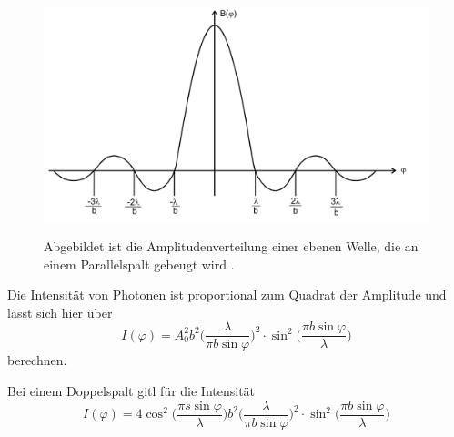  \begin{figure}[H]
    \centering
    \caption{Abgebildet ist die Amplitudenverteilung einer ebenen Welle, die an einem Parallelspalt gebeugt wird \cite{V406}.}
    \includegraphics{Bilder/Amplitude.png}
    \label{fig:Amplitude}
\end{figure}

Die Intensität von Photonen ist proportional zum Quadrat der Amplitude und lässt sich hier über 
\begin{equation}
    I(\varphi)=A_0^2 b^2 \biggl( \frac{\lambda}{\pi b \sin \varphi}\biggr)^2 \cdot \sin^2 \biggl( \frac{\pi b \sin \varphi}{\lambda}\biggr)
    \label{fig:Intensität}
\end{equation}
berechnen.

Bei einem Doppelspalt gitl für die Intensität
\begin{equation}
    I(\varphi)=4 \cos^2 \biggl( \frac{\pi s \sin \varphi }{\lambda} \biggr) b^2 \biggl( \frac{\lambda}{\pi b \sin \varphi}\biggr)^2 \cdot \sin^2 \biggl( \frac{\pi b \sin \varphi}{\lambda}\biggr)
    \label{fig:Intensität2}
\end{equation}

\cite{V406}